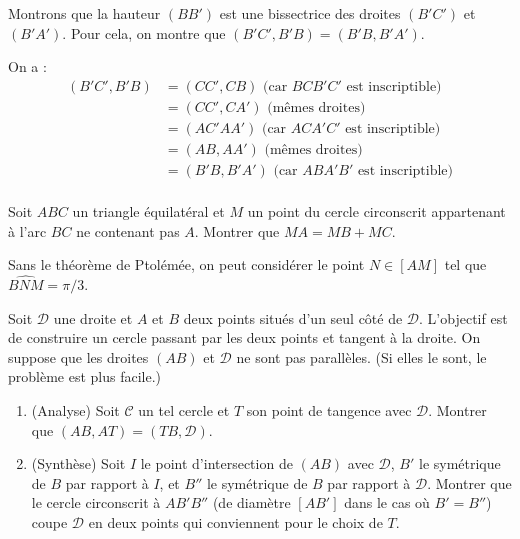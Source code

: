 \begin{exo}
\begin{sol}
Montrons que la hauteur $(BB')$ est une bissectrice des droites $(B'C')$ et $(B'A')$. Pour cela, on montre que $(B'C',B'B)=(B'B,B'A')$.

On a :
\begin{align*}
(B'C',B'B)
&= (CC',CB) \text{ (car $BCB'C'$ est inscriptible)}\\
&= (CC',CA') \text{ (mêmes droites)}\\
&= (AC'AA') \text{ (car $ACA'C'$ est inscriptible)}\\
&= (AB,AA') \text{ (mêmes droites)}\\
&= (B'B,B'A') \text{ (car $ABA'B'$ est inscriptible)}\\
\end{align*}

\end{sol}  
\end{exo}  



\begin{exo} %
Soit $ABC$ un triangle équilatéral et $M$ un point du cercle circonscrit appartenant à l'arc $BC$ ne contenant pas $A$. Montrer que $MA= MB+MC$.

\begin{hint}Sans le théorème de Ptolémée, on peut considérer le point $N \in [AM]$ tel que $\widehat{BNM}=\pi/3$.
\end{hint}
\end{exo}  




\begin{exo} %
Soit $\mathcal D$ une droite et $A$ et $B$ deux points situés d'un seul côté de $\mathcal D$. L'objectif est de construire un cercle passant par les deux points et tangent à la droite. On suppose que les droites $(AB)$ et $\mathcal D$ ne sont pas parallèles. (Si elles le sont, le problème est plus facile.)

\begin{enumerate}
\item (Analyse) Soit $\mathcal C$ un tel cercle et $T$ son point de tangence avec $\mathcal D$. Montrer que $(AB,AT) = (TB,\mathcal D)$. %
\item (Synthèse) Soit $I$ le point d'intersection de $(AB)$ avec $\mathcal D$, $B'$ le symétrique de $B$ par rapport à $I$, et $B''$ le symétrique de $B$ par rapport à $\mathcal D$. Montrer que le cercle circonscrit à $AB'B''$ (de diamètre $[AB']$ dans le cas où $B'=B''$) coupe $\mathcal D$ en deux points qui conviennent pour le choix de $T$.
\end{enumerate}

\end{exo}  


